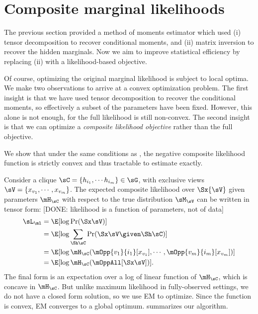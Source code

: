 \section{Composite marginal likelihoods}
\label{sec:piecewise}

The previous section provided a method of moments estimator
which used (i) tensor decomposition to recover conditional moments,
and (ii) matrix inversion to recover the hidden marginals.
Now we aim to improve statistical efficiency by replacing (ii) with a likelihood-based objective.

Of course, optimizing the original marginal likelihood is subject to local optima.
We make two observations to arrive at a convex optimization problem.
The first insight is that we have used tensor decomposition to recover the conditional moments,
so effectively a subset of the parameters have been fixed.
However, this alone is not enough, for the full likelihood is still non-convex.
The second insight is that we can optimize a \emph{composite likelihood objective} \cite{lindsay88composite}
rather than the full objective.

We show that under the same conditions as , the
  negative composite likelihood function is strictly convex and thus
  tractable to estimate exactly.

Consider a clique $\sC = \{h_{i_1}, \cdots h_{i_m}\} \in \sG$, with
  exclusive views $\sV = \{x_{v_1}, \cdots, x_{v_m}\}$. 
The expected composite likelihood over $\Sx{\sV}$ given parameters $\mH_\sC$
with respect to the true distribution $\sM_\sV$ can be written in tensor form:
  [DONE: likelihood is a function of parameters, not of data]
\begin{align*}
  \sL_\ml %
  &= \E[\log \Pr( \Sx \sV )] \\
  &= \E[\log \sum_{\Sh \sC} \Pr( \Sx \sV \given \Sh \sC )] \\
  &= \E[\log \mH_\sC(\mOpp{v_1}{i_1} [x_{v_1}], \cdots, \mOpp{v_m}{i_m} [x_{v_m}])] \\
  &= \E[\log \mH_\sC(\mOppAll[\Sx\sV])].
\end{align*}
The final form is an expectation over a log of linear function of $\mH_\sC$, which is concave in
$\mH_\sC$.  But unlike maximum likelihood in fully-observed settings,
we do not have a closed form solution, so we use EM to optimize.
Since the function is convex, EM converges to a global optimum.
 summarizes our algorithm.

